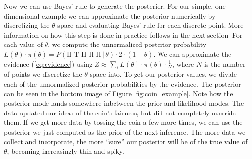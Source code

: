 \documentclass[12pt, a4paper]{report}
\begin{document}
Now we can use Bayes' rule to generate the posterior.
For our simple, one-dimensional example we can approximate the posterior numerically by discretizing the $\theta$-space and evaluating Bayes' rule for each discrete point.
More information on how this step is done in practice follows in the next section.
For each value of $\theta$, we compute the unnormalized posterior probability $L(\theta) \cdot \pi(\theta) = P(\textrm{H T H H H} \, | \, \theta) \cdot 2 \cdot (1 - \theta)$.
We can approximate the evidence (\ref{eq:evidence}) using $Z \approx \sum_{i} L(\theta) \cdot \pi(\theta) \cdot \frac{1}{N}$, where $N$ is the number of points we discretize the $\theta$-space into.
To get our posterior values, we divide each of the unnormalized posterior probabilities by the evidence.
The posterior can be seen in the bottom image of Figure \ref{fig:coin_example}.
Note how the posterior mode lands somewhere inbetween the prior and likelihood modes.
The data updated our ideas of the coin's fairness, but did not completely override them.
If we get more data by tossing the coin a few more times, we can use the posterior we just computed as the prior of the next inference.
The more data we collect and incorporate, the more ``sure'' our posterior will be of the true value of $\theta$, becoming increasingly thin and spiky.
\end{document}

